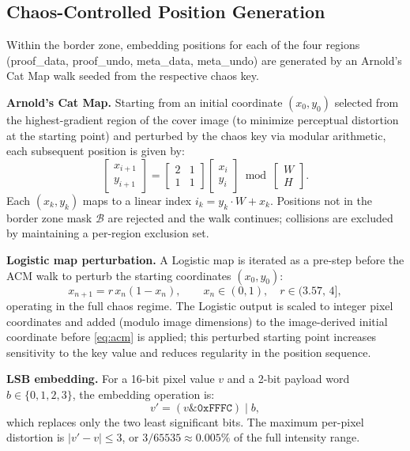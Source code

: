 \documentclass{jstarticle}
\begin{document}
\subsection{Chaos-Controlled Position Generation}

Within the border zone, embedding positions for each of the four regions (proof\_data, proof\_undo, meta\_data, meta\_undo) are generated by an Arnold's Cat Map walk seeded from the respective chaos key.

\textbf{Arnold's Cat Map.}
Starting from an initial coordinate $(x_0, y_0)$ selected from the highest-gradient region of the cover image (to minimize perceptual distortion at the starting point) and perturbed by the chaos key via modular arithmetic, each subsequent position is given by:
\begin{equation}
\begin{bmatrix} x_{i+1} \\ y_{i+1} \end{bmatrix}
=
\begin{bmatrix} 2 & 1 \\ 1 & 1 \end{bmatrix}
\begin{bmatrix} x_i \\ y_i \end{bmatrix}
\bmod \begin{bmatrix} W \\ H \end{bmatrix}.
\label{eq:acm}
\end{equation}
Each $(x_k, y_k)$ maps to a linear index $i_k = y_k \cdot W + x_k$.
Positions not in the border zone mask $\mathcal{B}$ are rejected and the walk continues; collisions are excluded by maintaining a per-region exclusion set.

\textbf{Logistic map perturbation.}
A Logistic map is iterated as a pre-step before the ACM walk to perturb the starting coordinates $(x_0, y_0)$:
\begin{equation}
x_{n+1} = r \, x_n (1 - x_n), \qquad x_n \in (0,1),\quad r \in (3.57,\, 4],
\label{eq:logistic}
\end{equation}
operating in the full chaos regime.
The Logistic output is scaled to integer pixel coordinates and added (modulo image dimensions) to the image-derived initial coordinate before \eqref{eq:acm} is applied; this perturbed starting point increases sensitivity to the key value and reduces regularity in the position sequence.

\textbf{LSB embedding.}
For a 16-bit pixel value $v$ and a 2-bit payload word $b \in \{0, 1, 2, 3\}$, the embedding operation is:
\begin{equation}
v' = (v \mathbin{\&} \mathtt{0xFFFC}) \mathbin{|} b,
\label{eq:lsb16}
\end{equation}
which replaces only the two least significant bits.
The maximum per-pixel distortion is $|v' - v| \leq 3$, or $3 / 65535 \approx 0.005\%$ of the full intensity range.
\end{document}
